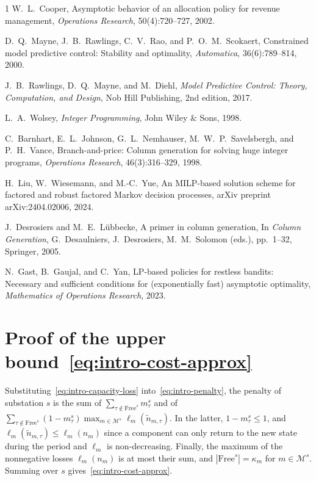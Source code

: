 \documentclass{article}
\begin{document}
\begin{thebibliography}{1}
W.~L.~Cooper,
\newblock Asymptotic behavior of an allocation policy for revenue management,
\newblock \emph{Operations Research}, 50(4):720--727, 2002.

D.~Q.~Mayne, J.~B.~Rawlings, C.~V.~Rao, and P.~O.~M.~Scokaert,
\newblock Constrained model predictive control: Stability and optimality,
\newblock \emph{Automatica}, 36(6):789--814, 2000.

J.~B.~Rawlings, D.~Q.~Mayne, and M.~Diehl,
\newblock \emph{Model Predictive Control: Theory, Computation, and Design},
\newblock Nob Hill Publishing, 2nd edition, 2017.

L.~A.~Wolsey,
\newblock \emph{Integer Programming},
\newblock John Wiley \& Sons, 1998.

C.~Barnhart, E.~L.~Johnson, G.~L.~Nemhauser, M.~W.~P.~Savelsbergh, and P.~H.~Vance,
\newblock Branch-and-price: Column generation for solving huge integer programs,
\newblock \emph{Operations Research}, 46(3):316--329, 1998.

H.~Liu, W.~Wiesemann, and M.-C.~Yue,
\newblock An MILP-based solution scheme for factored and robust factored {M}arkov decision
  processes,
\newblock arXiv preprint arXiv:2404.02006, 2024.

J.~Desrosiers and M.~E.~L\"ubbecke,
\newblock A primer in column generation,
\newblock In \emph{Column Generation}, G.~Desaulniers, J.~Desrosiers, M.~M.~Solomon (eds.),
  pp.~1--32, Springer, 2005.

N.~Gast, B.~Gaujal, and C.~Yan,
\newblock LP-based policies for restless bandits: Necessary and sufficient conditions for
  (exponentially fast) asymptotic optimality,
\newblock \emph{Mathematics of Operations Research}, 2023.

\end{thebibliography}
 
 
\appendix

\section{Proof of the upper bound~\eqref{eq:intro-cost-approx}}
\label{app:cost-bound}

Substituting~\eqref{eq:intro-capacity-loss} into~\eqref{eq:intro-penalty}, the penalty of substation $s$ is the sum of
$\sum_{\tau \notin \text{Free}^s} m^s_\tau$ and of $\sum_{\tau \notin \text{Free}^s} (1 - m^s_\tau)
\max_{m \in \mathcal{M}^s} \ell_m(\tilde n_{m,\tau})$. In the latter, $1 - m^s_\tau \le 1$, and $\ell_m(\tilde
n_{m,\tau}) \le \ell_m(n_m)$ since a component can only return to the new state during the period and $\ell_m$ is
non-decreasing. Finally, the maximum of the nonnegative losses $\ell_m(n_m)$ is at most their sum, and
$|\text{Free}^{s}| = \kappa_m$ for $m \in \mathcal{M}^s$. Summing over $s$ gives~\eqref{eq:intro-cost-approx}.
\end{document}
